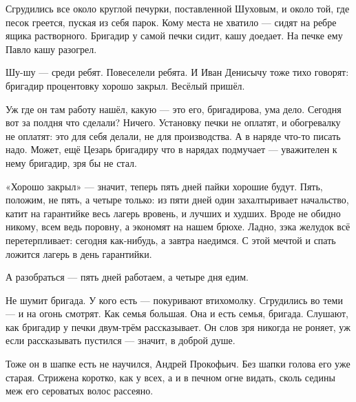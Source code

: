 Сгрудились все около круглой печурки, поставленной Шуховым, и около той, где песок греется,
пуская из себя парок. Кому места не хватило --- сидят на ребре ящика растворного. Бригадир у
самой печки сидит, кашу доедает. На печке ему Павло кашу разогрел.

Шу-шу --- среди ребят. Повеселели ребята. И Иван Денисычу тоже тихо говорят: бригадир
процентовку хорошо закрыл. Весёлый пришёл.

Уж где он там работу нашёл, какую --- это его, бригадирова, ума дело. Сегодня вот за полдня что
сделали? Ничего. Установку печки не оплатят, и обогревалку не оплатят: это для себя делали, не
для производства. А в наряде что-то писать надо. Может, ещё Цезарь бригадиру что в нарядах
подмучает --- уважителен к нему бригадир, зря бы не стал.

«Хорошо закрыл» --- значит, теперь пять дней пайки хорошие будут. Пять, положим, не пять, а
четыре только: из пяти дней один захалтыривает начальство, катит на гарантийке весь лагерь
вровень, и лучших и худших. Вроде не обидно никому, всем ведь поровну, а экономят на нашем
брюхе. Ладно, зэка желудок всё перетерпливает: сегодня как-нибудь, а завтра наедимся. С этой
мечтой и спать ложится лагерь в день гарантийки.

А разобраться --- пять дней работаем, а четыре дня едим.

Не шумит бригада. У кого есть --- покуривают втихомолку. Сгрудились во теми --- и на огонь
смотрят. Как семья большая. Она и есть семья, бригада. Слушают, как бригадир у печки двум-трём
рассказывает. Он слов зря никогда не роняет, уж если рассказывать пустился --- значит, в
доброй душе.

Тоже он в шапке есть не научился, Андрей Прокофьич. Без шапки голова его уже старая. Стрижена
коротко, как у всех, а и в печном огне видать, сколь седины меж его сероватых волос рассеяно.

